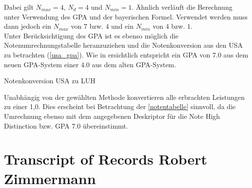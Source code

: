 \documentclass[12pt]{scrartcl}
\begin{document}
Dabei gilt $N_{max} = 4$, $N_d = 4$ und $N_{min} = 1$. Ähnlich verläuft die Berechnung unter Verwendung des GPA und der bayerischen Formel. Verwendet werden muss dann jedoch ein $N_{max}$ von $7$ bzw. $4$ und ein $N_{min}$ von $4$ bzw. $1$. \cite{LUHNotenumrechnung}\cite{GPA}\\
 Unter Berücksichtigung des GPA ist es ebenso möglich die Notenumrechnungstabelle heranzuziehen und die Notenkonversion aus den USA zu betrachten (\autoref{usa_gpa}). Wie in \cite{GPA} ersichtlich entspricht ein GPA von 7.0 aus dem neuen GPA-System einer 4.0 aus dem alten GPA-System. 
 \begin{table}[!ht]
 	\centering
 	\caption{Notenkonversion USA zu LUH}
 	\label{usa_gpa}
 \end{table}
 
 Unabhängig von der gewählten Methode konvertieren alle erbrachten Leistungen zu einer 1,0. Dies erscheint bei Betrachtung der \autoref{notentabelle} sinnvoll, da die Umrechnung ebenso mit dem angegebenen Deskriptor für die Note High Distinction bzw. GPA 7.0 übereinstimmt.
\newpage



\newpage

\appendix
{}
\vspace*{\fill}
\hspace*{\fill}

\section{Transcript of Records Robert Zimmermann}
\label{transcript}

\hspace*{\fill}
\vspace*{\fill}


\label{bsp_anw}
\end{document}
